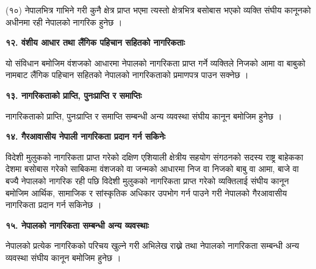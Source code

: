 (१०) नेपालभित्र गाभिने गरी कुनै क्षेत्र प्राप्त भएमा त्यस्तो क्षेत्रभित्र बसोबास भएको व्यक्ति संघीय कानूनको अधीनमा रही नेपालको नागरिक हुनेछ ।

\textbf{१२. वंशीय आधार तथा लैंगिक पहिचान सहितको नागरिकताः}

यो संविधान बमोजिम वंशजको आधारमा नेपालको नागरिकता प्राप्त गर्ने व्यक्तिले निजको आमा वा बाबुको नामबाट लैंगिक पहिचान सहितको नेपालको नागरिकताको प्रमाणपत्र पाउन सक्नेछ ।

\textbf{१३. नागरिकताको प्राप्ति, पुनःप्राप्ति र समाप्तिः}

नागरिकताको प्राप्ति, पुनःप्राप्ति र समाप्ति सम्बन्धी अन्य व्यवस्था संघीय कानून बमोजिम हुनेछ ।

\textbf{१४. गैरआवासीय नेपाली नागरिकता प्रदान गर्न सकिनेः}

विदेशी मुलुकको नागरिकता प्राप्त गरेको दक्षिण एशियाली क्षेत्रीय सहयोग संगठनको सदस्य राष्ट्र बाहेकका देशमा बसोबास गरेको साबिकमा वंशजको वा जन्मको आधारमा निज वा निजको बाबु वा आमा, बाजे वा बज्यै नेपालको नागरिक रही पछि विदेशी मुलुकको नागरिकता प्राप्त गरेको व्यक्तिलाई संघीय कानून बमोजिम आर्थिक, सामाजिक र सांस्कृतिक अधिकार उपभोग गर्न पाउने गरी
नेपालको गैरआवासीय नागरिकता प्रदान गर्न सकिनेछ ।

\textbf{१५. नेपालको नागरिकता सम्बन्धी अन्य व्यवस्थाः}

नेपालको प्रत्येक नागरिकको परिचय खुल्ने गरी अभिलेख राख्ने तथा नेपालको नागरिकता सम्बन्धी अन्य व्यवस्था संघीय कानून बमोजिम हुनेछ ।
